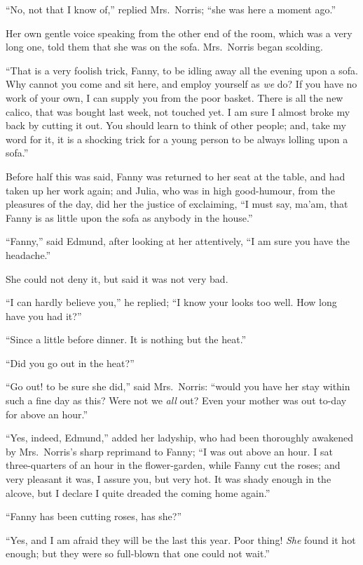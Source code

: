 ``No, not that I know of,'' replied Mrs.\ Norris; ``she was
here a moment ago.''

Her own gentle voice speaking from the other end
of the room, which was a very long one, told them
that she was on the sofa.  Mrs.\ Norris began scolding.

``That is a very foolish trick, Fanny, to be idling away all
the evening upon a sofa.  Why cannot you come and sit here,
and employ yourself as \emph{we} do?  If you have no work
of your own, I can supply you from the poor basket.
There is all the new calico, that was bought last week,
not touched yet.  I am sure I almost broke my back
by cutting it out.  You should learn to think of
other people; and, take my word for it, it is a shocking
trick for a young person to be always lolling upon a sofa.''

Before half this was said, Fanny was returned to her
seat at the table, and had taken up her work again;
and Julia, who was in high good-humour, from the pleasures
of the day, did her the justice of exclaiming, ``I must say,
ma'am, that Fanny is as little upon the sofa as anybody
in the house.''

``Fanny,'' said Edmund, after looking at her attentively,
``I am sure you have the headache.''

She could not deny it, but said it was not very bad.

``I can hardly believe you,'' he replied; ``I know your looks
too well.  How long have you had it?''

``Since a little before dinner.  It is nothing but the heat.''

``Did you go out in the heat?''

``Go out! to be sure she did,'' said Mrs.\ Norris:
``would you have her stay within such a fine day as this?
Were not we \emph{all} out?  Even your mother was out to-day
for above an hour.''

``Yes, indeed, Edmund,'' added her ladyship, who had been
thoroughly awakened by Mrs.\ Norris's sharp reprimand
to Fanny; ``I was out above an hour.  I sat three-quarters
of an hour in the flower-garden, while Fanny cut the roses;
and very pleasant it was, I assure you, but very hot.
It was shady enough in the alcove, but I declare I quite
dreaded the coming home again.''

``Fanny has been cutting roses, has she?''

``Yes, and I am afraid they will be the last this year.
Poor thing!  \emph{She} found it hot enough; but they were so
full-blown that one could not wait.''


